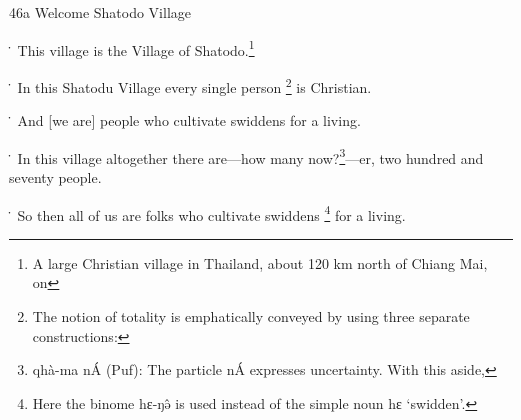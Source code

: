 
46a Welcome Shatodo Village

\. This village is the Village of Shatodo.\footnote{A large Christian village in Thailand, about 120 km north of Chiang Mai, on}

\. In this Shatodu Village every single person \footnote{The notion of totality is emphatically conveyed by using three separate constructions:} is Christian.

\. And [we are] people who cultivate swiddens for a living.

\. In this village altogether there are---how many now?\footnote{qhà-ma nÁ (Puf): The particle nÁ expresses uncertainty. With this aside,}---er, two hundred and
seventy people.

\. So then all of us are folks who cultivate swiddens \footnote{Here the binome hɛ-ŋə̂ is used instead of the simple noun hɛ `swidden'.} for a living.

